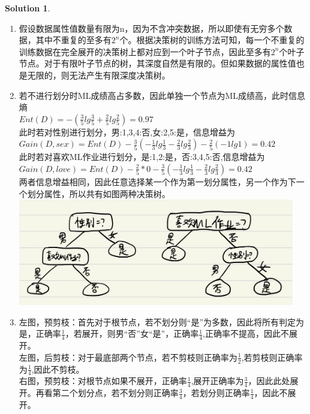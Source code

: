 \documentclass[a4paper,UTF8]{article}
\theoremstyle{definition}
\newtheorem*{solution}{Solution}
\begin{document}
\begin{solution}\ \\
\begin{enumerate}[(1)]
	\item 假设数据属性值数量有限为n，因为不含冲突数据，所以即使有无穷多个数据，其中不重复的至多有$2^n$个。根据决策树的训练方法可知，每一个不重复的训练数据在完全展开的决策树上都对应到一个叶子节点，因此至多有$2^n$个叶子节点。对于有限叶子节点的树，其深度自然是有限的。但如果数据的属性值也是无限的，则无法产生有限深度决策树。
	\item 若不进行划分时ML成绩高占多数，因此单独一个节点为ML成绩高，此时信息熵\\
		  $Ent(D)=-(\frac{3}{5}lg\frac{3}{5}+\frac{2}{5}lg\frac{2}{5})=0.97$\\
		  此时若对性别进行划分，男:1,3,4:否,女:2,5:是，信息增益为\\
		  $Gain(D,sex)=Ent(D)-\frac{3}{5}(-\frac{1}{3}lg\frac{1}{3}-\frac{2}{3}lg\frac{2}{3})-\frac{2}{5}(-1lg1)=0.42$\\
		  此时若对喜欢ML作业进行划分，是:1,2:是，否:3,4,5:否,信息增益为\\
		  $Gain(D,love)=Ent(D)-\frac{2}{5}*0-\frac{3}{5}(-\frac{1}{3}lg\frac{1}{3}-\frac{2}{3}lg\frac{2}{3})=0.42$\\
		  两者信息增益相同，因此任意选择某一个作为第一划分属性，另一个作为下一个划分属性，所以共有如图两种决策树。\\
		  \includegraphics[width=0.95\textwidth]{figure/pr22.png}
	\item 左图，预剪枝：首先对于根节点，若不划分则“是”为多数，因此将所有判定为是，正确率$\frac{1}{4}$，若展开，则男“否”女“是”，正确率$\frac{1}{4}$,正确率不提高，因此不展开。
		  \\左图，后剪枝：对于最底部两个节点，若不剪枝则正确率为$\frac{1}{2}$,若剪枝则正确率为$\frac{1}{4}$,因此不剪枝。
		  \\右图，预剪枝：对根节点如果不展开，正确率$\frac{1}{4}$,展开正确率为$\frac{3}{4}$，因此此处展开。再看第二个划分点，若不划分则正确率$\frac{3}{4}$，若划分则正确率$\frac{1}{4}$，因此不展开。

\end{enumerate}
\end{solution}
\end{document}

